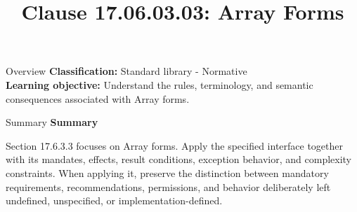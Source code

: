 \documentclass[10pt,letterpaper]{article}
\title{Clause 17.06.03.03: Array Forms}
\author{}
\date{}
\begin{document}
\maketitle
\begin{CornellOverviewBox}{Overview}
\textbf{Classification:} Standard library - Normative\\[2pt]
\textbf{Learning objective:} Understand the rules, terminology, and semantic consequences associated with Array forms.
\end{CornellOverviewBox}\begin{CornellSummaryBox}{Summary}
{\sffamily\bfseries\color{Accent} Summary}\par\vspace{3pt}Section 17.6.3.3 focuses on Array forms. Apply the specified interface together with its mandates, effects, result conditions, exception behavior, and complexity constraints. When applying it, preserve the distinction between mandatory requirements, recommendations, permissions, and behavior deliberately left undefined, unspecified, or implementation-defined.
\end{CornellSummaryBox}
\end{document}
